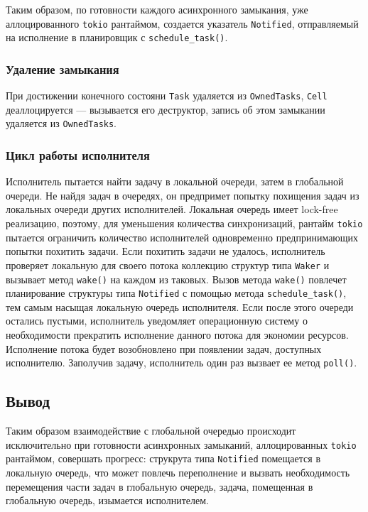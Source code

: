 Таким образом, по готовности каждого асинхронного замыкания, уже аллоцированного \verb|tokio| рантаймом, создается указатель \verb|Notified|, отправляемый на исполнение в планировщик с \verb|schedule_task()|.

\subsubsection{Удаление замыкания}

При достижении конечного состояни \verb|Task| удаляется из \verb|OwnedTasks|, \verb|Cell| деаллоцируется --- вызывается его деструктор, запись об этом замыкании удаляется из \verb|OwnedTasks|.

\subsubsection{Цикл работы исполнителя}

Исполнитель пытается найти задачу в локальной очереди, затем в глобальной очереди. Не найдя задач в очередях, он предпримет попытку похищения задач из локальных очереди других исполнителей. Локальная очередь имеет lock-free реализацию, поэтому, для уменьшения количества синхронизаций, рантайм \verb|tokio| пытается ограничить количество исполнителей одновременно предпринимающих попытки похитить задачи. Если похитить задачи не удалось, исполнитель проверяет локальную для своего потока коллекцию структур типа \verb|Waker| и вызывает метод \verb|wake()| на каждом из таковых. Вызов метода \verb|wake()| повлечет планирование структуры типа \verb|Notified| с помощью метода \verb|schedule_task()|, тем самым насыщая локальную очередь исполнителя. Если после этого очереди остались пустыми, исполнитель уведомляет операционную систему о необходимости прекратить исполнение данного потока для экономии ресурсов. Исполнение потока будет возобновлено при появлении задач, доступных исполнителю. Заполучив задачу, исполнитель один раз вызвает ее метод \verb|poll()|.

\subsection{Вывод}

Таким образом взаимодействие с глобальной очередью происходит исключительно при готовности асинхронных замыканий, аллоцированных \verb|tokio| рантаймом, совершать прогресс: струкрута типа \verb|Notified| помещается в локальную очередь, что может повлечь переполнение и вызвать необходимость перемещения части задач в глобальную очередь, задача, помещенная в глобальную очередь, изымается исполнителем.

